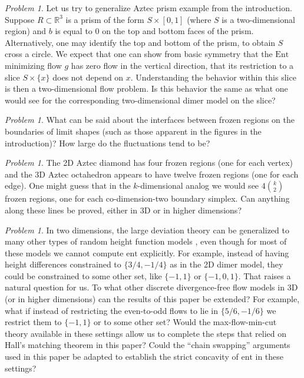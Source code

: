 \documentclass[11pt]{article}
\theoremstyle{remark}
\newtheorem{problem}[thm]{Problem}
\theoremstyle{definition}
\newcommand{\ent}{\text{ent}}
\newcommand{\Ent}{\text{Ent}}
\newcommand{\m}[1]{\mathbb{#1}}
\begin{document}
\begin{problem} Let us try to generalize Aztec prism example from the introduction. Suppose $R\subset \m R^3$ is a prism of the form $S \times [0,1]$ (where $S$ is a two-dimensional region) and $b$ is equal to $0$ on the top and bottom faces of the prism. Alternatively, one may identify the top and bottom of the prism, to obtain $S$ cross a circle. We expect that one can show from basic symmetry that the $\Ent$ minimizing flow $g$ has zero flow in the vertical direction, that its restriction to a slice $S \times \{x \}$ does not depend on $x$.  Understanding the behavior within this slice is then a two-dimensional flow problem. Is this behavior the same as what one would see for the corresponding two-dimensional dimer model on the slice?
\end{problem}

\begin{problem}
What can be said about the interfaces between frozen regions on the boundaries of limit shapes (such as those apparent in the figures in the introduction)? How large do the fluctuations tend to be?
\end{problem} 

\begin{problem}
The 2D Aztec diamond has four frozen regions (one for each vertex) and the 3D Aztec octahedron appears to have twelve frozen regions (one for each edge). One might guess that in the $k$-dimensional analog we would see $4 \binom{k}{2}$ frozen regions, one for each co-dimension-two boundary simplex. Can anything along these lines be proved, either in 3D or in higher dimensions?
\end{problem} 

\begin{problem}
In two dimensions, the large deviation theory \cite{cohn2001variational} can be generalized to many other types of random height function models \cite{AST_2005__304__R1_0}, even though for most of these models we cannot compute $\ent$ explicitly. For example, instead of having height differences constrained to $\{3/4,-1/4 \}$ as in the 2D dimer model, they could be constrained to some other set, like $\{-1,1\}$ or $\{-1,0,1\}$. That raises a natural question for us. To what other discrete divergence-free flow models in 3D (or in higher dimensions) can the results of this paper be extended? For example, what if instead of restricting the even-to-odd flows to lie in $\{5/6,-1/6\}$ we restrict them to $\{-1,1\}$ or to some other set? Would the max-flow-min-cut theory available in these settings allow us to complete the steps that relied on Hall's matching theorem in this paper? Could the ``chain swapping'' arguments used in this paper be adapted to establish the strict concavity of $\ent$ in these settings?
\end{problem}
\end{document}
